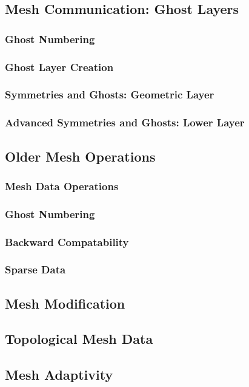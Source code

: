 \subsection{Mesh Communication: Ghost Layers}
\label{sec:ghost}

\subsubsection{Ghost Numbering}

\subsubsection{Ghost Layer Creation}

\subsubsection{Symmetries and Ghosts: Geometric Layer}

\subsubsection{Advanced Symmetries and Ghosts: Lower Layer}

\subsection{Older Mesh Operations}

\subsubsection{Mesh Data Operations}

\subsubsection{Ghost Numbering}

\subsubsection{Backward Compatability}

\subsubsection{Sparse Data}

\subsection{Mesh Modification}

\subsection{Topological Mesh Data}

\subsection{Mesh Adaptivity}

